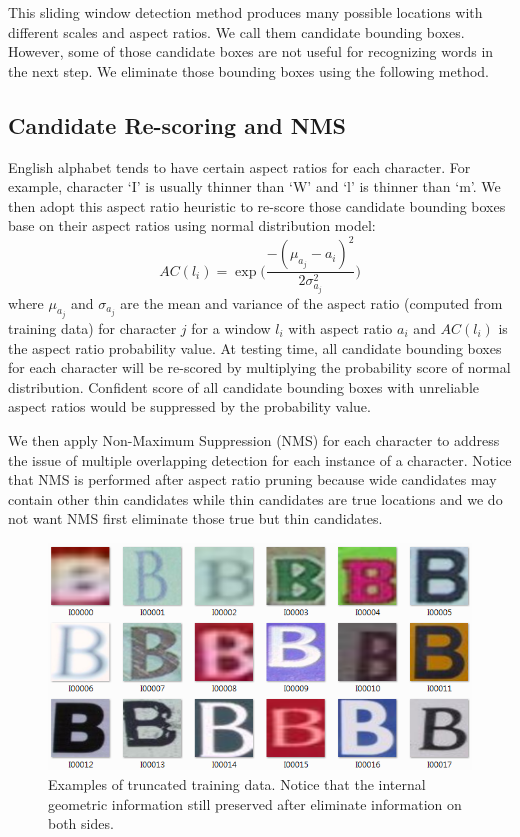\documentclass[10pt,twocolumn,letterpaper]{article}
\begin{document}
This sliding window detection method produces many possible locations with different scales and aspect ratios. We call them candidate bounding boxes. However, some of those candidate boxes are not useful for recognizing words in the next step. We eliminate those bounding boxes using the following method.

\subsection{Candidate Re-scoring and NMS}

English alphabet tends to have certain aspect ratios for each character. For example, character `I' is usually thinner than `W' and `l' is thinner than `m'. We then adopt this aspect ratio heuristic to re-score those candidate bounding boxes base on their aspect ratios using normal distribution model:
\[
AC(l_i) = \exp \Bigg( \frac{-(\mu_{a_j} - a_i)^2}{2\sigma_{a_j}^2} \Bigg)
\]
where $\mu_{a_j}$ and $\sigma_{a_j}$ are the mean and variance of the aspect ratio (computed from training data) for character $j$ for a window $l_i$ with aspect ratio $a_i$ and $AC(l_i)$ is the aspect ratio probability value. At testing time, all candidate bounding boxes for each character will be re-scored by multiplying the probability score of normal distribution. Confident score of all candidate bounding boxes with unreliable aspect ratios would be suppressed by the probability value.

We then apply Non-Maximum Suppression (NMS) for each character to address the issue of multiple overlapping detection for each instance of a character. Notice that NMS is performed after aspect ratio pruning because wide candidates may contain other thin candidates while thin candidates are true locations and we do not want NMS first eliminate those true but thin candidates.

\begin{figure}[t]
\begin{center}
\includegraphics[width=1\linewidth]{fig/train_data}
\end{center}
   \caption{Examples of truncated training data. Notice that the internal geometric information still preserved after eliminate information on both sides.}
\label{fig:sample1}
\end{figure}
\end{document}
